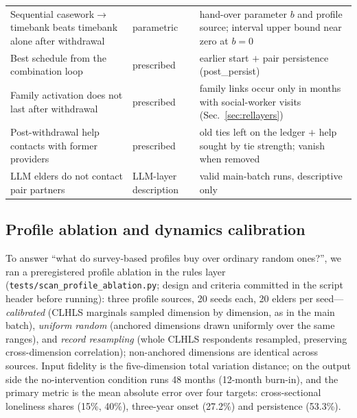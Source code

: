 \documentclass[10pt,twocolumn]{article}
\begin{document}
\begin{table}[t]
{\begin{tabular}{@{}>{\raggedright\arraybackslash}p{}>{\raggedright\arraybackslash}p{}>{\raggedright\arraybackslash}p{}@{}}
Sequential casework$\to$timebank beats timebank alone after withdrawal & parametric & hand-over parameter $b$ and profile source; interval upper bound near zero at $b=0$ \\
Best schedule from the combination loop & prescribed & earlier start $+$ pair persistence (post\_persist) \\
Family activation does not last after withdrawal & prescribed & family links occur only in months with social-worker visits (Sec.~\ref{sec:rellayers}) \\
Post-withdrawal help contacts with former providers & prescribed & old ties left on the ledger $+$ help sought by tie strength; vanish when removed \\
LLM elders do not contact pair partners & LLM-layer description & valid main-batch runs, descriptive only \\
\bottomrule
\end{tabular}}
\end{table}

\subsection{Profile ablation and dynamics calibration}\label{sec:calib}
To answer ``what do survey-based profiles buy over ordinary random ones?'', we ran a preregistered profile ablation in the rules layer (\texttt{tests/scan\_profile\_ablation.py}; design and criteria committed in the script header before running): three profile sources, 20 seeds each, 20 elders per seed---\emph{calibrated} (CLHLS marginals sampled dimension by dimension, as in the main batch), \emph{uniform random} (anchored dimensions drawn uniformly over the same ranges), and \emph{record resampling} (whole CLHLS respondents resampled, preserving cross-dimension correlation); non-anchored dimensions are identical across sources. Input fidelity is the five-dimension total variation distance; on the output side the no-intervention condition runs 48 months (12-month burn-in), and the primary metric is the mean absolute error over four targets: cross-sectional loneliness shares (15\%, 40\%), three-year onset (27.2\%) and persistence (53.3\%).
\end{document}

